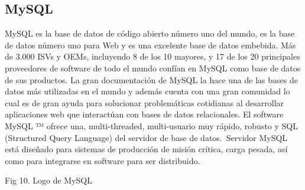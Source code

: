 \subsection{MySQL}
MySQL es la base de datos de código abierto número uno del mundo, es la base de datos número uno para Web y es una excelente base de datos embebida. Más de 3.000 ISVs y OEMs, incluyendo 8 de los 10 mayores, y 17 de los 20 principales proveedores de software de todo el mundo confían en MySQL como base de datos de sus productos.
La gran documentación de MySQL la hace una de las bases de datos más utilizadas en el mundo y además cuenta con una gran comunidad lo cual es de gran ayuda para solucionar problemáticas cotidianas al desarrollar aplicaciones web que interactúan con bases de datos relacionales.
El software MySQL ™ ofrece una, multi-threaded, multi-usuario muy rápido, robusto y SQL (Structured Query Language) del servidor de base de datos. Servidor MySQL está diseñado para sistemas de producción de misión crítica, carga pesada, así como para integrarse en software para ser distribuido. \cite{mysql}



Fig 10. Logo de MySQL
